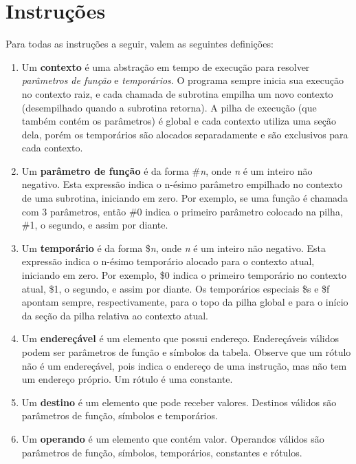 \documentclass[12pt,a4paper,extrafontsizes,article]{memoir}
\newcommand*{\srcfont}{\fontfamily{pcr}\selectfont}
\begin{document}
\clearpage
\chapter{Instruções}
\label{chp:instructions}

Para todas as instruções a seguir, valem as seguintes definições:
\begin{enumerate}
  \item Um \textbf{contexto} é uma abstração em tempo de execução para resolver \textit{parâmetros de função} e
  \textit{temporários}. O programa sempre inicia sua execução no contexto raiz, e cada chamada de subrotina empilha um
  novo contexto (desempilhado quando a subrotina retorna). A pilha de execução (que também contém os parâmetros) é
  global e cada contexto utiliza uma seção dela, porém os temporários são alocados separadamente e são exclusivos para
  cada contexto.
  
  \item Um \textbf{parâmetro de função} é da forma {\srcfont \#\textit{n}}, onde \textit{n} é um inteiro não negativo.
  Esta expressão indica o n-ésimo parâmetro empilhado no contexto de uma subrotina, iniciando em zero. Por exemplo, se
  uma função é chamada com 3 parâmetros, então {\srcfont \#0} indica o primeiro parâmetro colocado na pilha, {\srcfont
  \#1}, o segundo, e assim por diante.
  
  \item Um \textbf{temporário} é da forma {\srcfont \$\textit{n}}, onde \textit{n} é um inteiro não negativo.
  Esta expressão indica o n-ésimo temporário alocado para o contexto atual, iniciando em zero. Por exemplo, {\srcfont
  \$0} indica o primeiro temporário no contexto atual, {\srcfont \$1}, o segundo, e assim por diante. Os temporários
  especiais {\srcfont \$s} e {\srcfont \$f} apontam sempre, respectivamente, para o topo da pilha global e para o início
  da seção da pilha relativa ao contexto atual.
  
  \item Um \textbf{endereçável} é um elemento que possui endereço. Endereçáveis válidos podem ser parâmetros de função e
  símbolos da tabela. Observe que um rótulo não é um endereçável, pois indica o endereço de uma instrução, mas não
  tem um endereço próprio. Um rótulo é uma constante.
  
  \item Um \textbf{destino} é um elemento que pode receber valores. Destinos válidos são parâmetros de função, símbolos
  e temporários.

  \item Um \textbf{operando} é um elemento que contém valor. Operandos válidos são parâmetros de função, símbolos,
  temporários, constantes e rótulos.
\end{enumerate}
\end{document}
